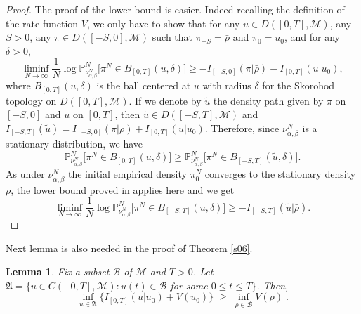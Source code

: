 \documentclass[reqno]{amsart}
\newtheorem{lemma}[theorem]{Lemma}
\begin{document}
\begin{proof}
The proof of the lower bound is easier. Indeed recalling the
definition of the rate function $V$, we only have to show that for any
$u\in D([0,T],{{\mathscr M}})$, any $S>0$, any $\pi\in D([-S,0],{{\mathscr M}})$ such that
$\pi_{-S}=\bar \rho$ and $\pi_{0}=u_0$, and for any $\delta>0$,
\[
 \liminf_{N\to\infty} \frac 1N  \log
{{\mathbb P}}^N_{\nu^N_{\alpha, \beta}}
\big[\pi^N\in B_{[0,T]}(u,\delta)\big]
\ge -I_{[-S,0]}(\pi|\bar \rho)-I_{[0,T]}(u|u_0),
\]
where $B_{[0,T]}(u,\delta)$ is the ball centered at $u$ with radius
$\delta$ for the Skorohod topology on $D([0,T],{{\mathscr M}})$.
If we denote by $\tilde u$ the density path given by
$\pi$ on $[-S,0]$ and $u$ on $[0,T]$, then $\tilde u\in D([-S,T],{{\mathscr M}})$ and $I_{[-S,T]}(\tilde u)=I_{[-S,0]}(\pi|\bar
\rho)+I_{[0,T]}(u|u_0)$.
Therefore, since $\nu^N_{\alpha, \beta}$ is a stationary
distribution, we have 
\[
{{\mathbb P}}^N_{\nu^N_{\alpha, \beta}}
\big[\pi^N\in B_{[0,T]}(u,\delta)\big]
\ge {{\mathbb P}}^N_{\nu^N_{\alpha, \beta}}
\big[\pi^N\in B_{[-S,T]}(\tilde u,\delta)\big].
\]
As under $\nu^N_{\alpha, \beta}$ the initial empirical density
$\pi^N_0$ converges to the stationary density $\bar\rho$, the lower
bound proved in \cite{blm1} applies here and we get
\[
 \liminf_{N\to\infty} \frac 1N  \log
{{\mathbb P}}^N_{\nu^N_{\alpha, \beta}}
\big[\pi^N\in B_{[-S,T]}(u,\delta)\big]
\ge -I_{[-S,T]}(\tilde u|\bar\rho).
\]
\end{proof}

Next lemma is also needed in the proof of Theorem \ref{s06}.

\begin{lemma}
\label{s07}
Fix a subset ${{\mathscr B}}$ of ${{\mathscr M}}$ and $T>0$. Let ${{\mathfrak A}} = \{u \in
C([0,T], {{\mathscr M}}): u(t) \in {{\mathscr B}}$ for some $0\le t\le T\}$. Then,
\begin{equation*}
\inf_{u\in {{\mathfrak A}}} \big\{ I_{[0,T]} (u | u_0) + V(u_0)\} \;\ge\;
\inf_{\rho\in{{\mathscr B}}} V(\rho)\;.
\end{equation*}
\end{lemma}
\end{document}
